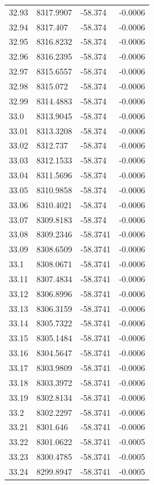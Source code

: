 \begin{table}[H]
\begin{tabular}{llll}
32.93 & 8317.9907 & -58.374 & -0.0006 \\
32.94 & 8317.407 & -58.374 & -0.0006 \\
32.95 & 8316.8232 & -58.374 & -0.0006 \\
32.96 & 8316.2395 & -58.374 & -0.0006 \\
32.97 & 8315.6557 & -58.374 & -0.0006 \\
32.98 & 8315.072 & -58.374 & -0.0006 \\
32.99 & 8314.4883 & -58.374 & -0.0006 \\
33.0 & 8313.9045 & -58.374 & -0.0006 \\
33.01 & 8313.3208 & -58.374 & -0.0006 \\
33.02 & 8312.737 & -58.374 & -0.0006 \\
33.03 & 8312.1533 & -58.374 & -0.0006 \\
33.04 & 8311.5696 & -58.374 & -0.0006 \\
33.05 & 8310.9858 & -58.374 & -0.0006 \\
33.06 & 8310.4021 & -58.374 & -0.0006 \\
33.07 & 8309.8183 & -58.374 & -0.0006 \\
33.08 & 8309.2346 & -58.3741 & -0.0006 \\
33.09 & 8308.6509 & -58.3741 & -0.0006 \\
33.1 & 8308.0671 & -58.3741 & -0.0006 \\
33.11 & 8307.4834 & -58.3741 & -0.0006 \\
33.12 & 8306.8996 & -58.3741 & -0.0006 \\
33.13 & 8306.3159 & -58.3741 & -0.0006 \\
33.14 & 8305.7322 & -58.3741 & -0.0006 \\
33.15 & 8305.1484 & -58.3741 & -0.0006 \\
33.16 & 8304.5647 & -58.3741 & -0.0006 \\
33.17 & 8303.9809 & -58.3741 & -0.0006 \\
33.18 & 8303.3972 & -58.3741 & -0.0006 \\
33.19 & 8302.8134 & -58.3741 & -0.0006 \\
33.2 & 8302.2297 & -58.3741 & -0.0006 \\
33.21 & 8301.646 & -58.3741 & -0.0006 \\
33.22 & 8301.0622 & -58.3741 & -0.0005 \\
33.23 & 8300.4785 & -58.3741 & -0.0005 \\
33.24 & 8299.8947 & -58.3741 & -0.0005 \\

\end{tabular}
\end{table}
